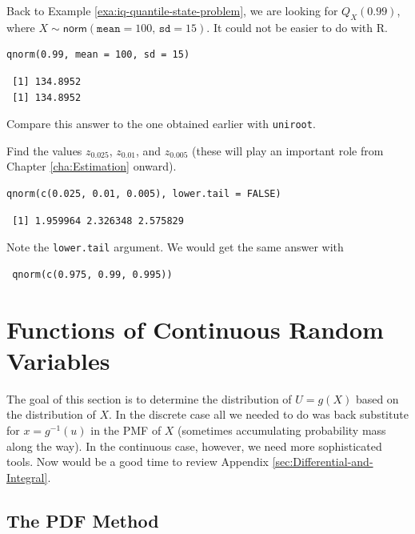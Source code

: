 \documentclass[captions=tableheading]{scrbook}
\begin{document}
\begin{example}
Back to Example \ref{exa:iq-quantile-state-problem}, we are looking for \(Q_{X}(0.99)\), where \(X\sim\mathsf{norm}(\mathtt{mean}=100,\,\mathtt{sd}=15)\). It could not be easier to do with \textsf{R}. 


\begin{verbatim}
qnorm(0.99, mean = 100, sd = 15)
\end{verbatim}

\begin{verbatim}
 [1] 134.8952
 [1] 134.8952
\end{verbatim}

Compare this answer to the one obtained earlier with \texttt{uniroot}.
\end{example}

\begin{example}
Find the values \(z_{0.025}\), \(z_{0.01}\), and \(z_{0.005}\) (these will play an important role from Chapter \ref{cha:Estimation} onward).
\end{example}


\begin{verbatim}
qnorm(c(0.025, 0.01, 0.005), lower.tail = FALSE)
\end{verbatim}

\begin{verbatim}
 [1] 1.959964 2.326348 2.575829
\end{verbatim}

Note the \texttt{lower.tail} argument. We would get the same answer with
\begin{verbatim}
 qnorm(c(0.975, 0.99, 0.995))
\end{verbatim}
\section{Functions of Continuous Random Variables}
\label{sec-6-4}

\label{sec:Functions-of-Continuous}

The goal of this section is to determine the distribution of \(U=g(X)\) based on the distribution of \(X\). In the discrete case all we needed to do was back substitute for \(x=g^{-1}(u)\) in the PMF of \(X\) (sometimes accumulating probability mass along the way). In the continuous case, however, we need more sophisticated tools. Now would be a good time to review Appendix \ref{sec:Differential-and-Integral}.
\subsection{The PDF Method}
\label{sec-6-4-1}
\end{document}
